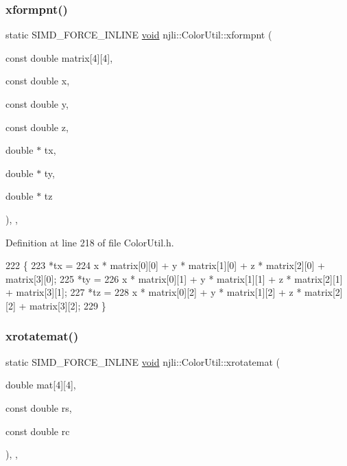 \subsubsection{\texorpdfstring{xformpnt()}{xformpnt()}}
{\footnotesize\ttfamily static S\+I\+M\+D\+\_\+\+F\+O\+R\+C\+E\+\_\+\+I\+N\+L\+I\+NE \mbox{\hyperlink{_thread_8h_af1e856da2e658414cb2456cb6f7ebc66}{void}} njli\+::\+Color\+Util\+::xformpnt (\begin{DoxyParamCaption}\item[{const double}]{matrix\mbox{[}4\mbox{]}\mbox{[}4\mbox{]},  }\item[{const double}]{x,  }\item[{const double}]{y,  }\item[{const double}]{z,  }\item[{double $\ast$}]{tx,  }\item[{double $\ast$}]{ty,  }\item[{double $\ast$}]{tz }\end{DoxyParamCaption})\hspace{0.3cm}{\ttfamily [inline]}, {\ttfamily [static]}, {\ttfamily [protected]}}



Definition at line 218 of file Color\+Util.\+h.


\begin{DoxyCode}
222     \{
223       *tx =
224           x * matrix[0][0] + y * matrix[1][0] + z * matrix[2][0] + matrix[3][0];
225       *ty =
226           x * matrix[0][1] + y * matrix[1][1] + z * matrix[2][1] + matrix[3][1];
227       *tz =
228           x * matrix[0][2] + y * matrix[1][2] + z * matrix[2][2] + matrix[3][2];
229     \}
\end{DoxyCode}
\mbox{\label{classnjli_1_1_color_util_aa2f35809a653366ba6cfc11a34227af0}} 
\subsubsection{\texorpdfstring{xrotatemat()}{xrotatemat()}}
{\footnotesize\ttfamily static S\+I\+M\+D\+\_\+\+F\+O\+R\+C\+E\+\_\+\+I\+N\+L\+I\+NE \mbox{\hyperlink{_thread_8h_af1e856da2e658414cb2456cb6f7ebc66}{void}} njli\+::\+Color\+Util\+::xrotatemat (\begin{DoxyParamCaption}\item[{double}]{mat\mbox{[}4\mbox{]}\mbox{[}4\mbox{]},  }\item[{const double}]{rs,  }\item[{const double}]{rc }\end{DoxyParamCaption})\hspace{0.3cm}{\ttfamily [inline]}, {\ttfamily [static]}, {\ttfamily [protected]}}



